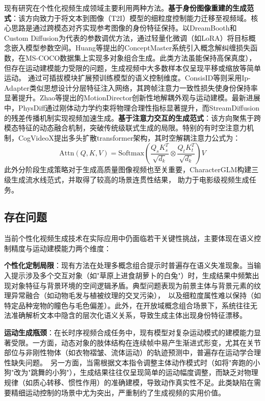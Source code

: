 现有研究在个性化视频生成领域主要利用两种方法。\textbf{基于身份图像重建的生成范式}：该方向致力于将文本到图像（T2I）模型的细粒度控制能力迁移至视频域。核心思路是通过跨模态对齐实现参考图像的身份特征保持。以DreamBooth\cite{ruiz2023dreambooth}和Custom Diffusion\cite{kumari2023multi}为代表的参数调优方法，通过轻量化微调（如LoRA）将目标概念嵌入模型参数空间。Huang等\cite{huang2025conceptmaster}提出的ConceptMaster系统引入概念解纠缠损失函数，在MS-COCO数据集上实现多对象组合生成。此类方法虽能保持高保真度），但存在运动建模能力受限的问题，生成视频中大多数样本仅呈现平移或缩放等简单运动。
通过可插拔模块扩展预训练模型的语义控制维度。ConsisID\cite{huang2024consistentid}等则采用Ip-Adapter类似思想设计分层特征注入网络，其跨帧注意力一致性损失使身份保持率显著提升。Zhao等\cite{zhao2024motiondirector}提出的MotionDirector创新性地解耦外观与运动建模。最新进展中，PhysDiff\cite{yuan2023physdiff}通过刚体动力学约束将物理合理性指标显著提升，而StreamDiffusion\cite{kodaira2023streamdiffusion}的残差传播机制实现视频加速生成。\textbf{基于注意力交互的生成范式}：该方向聚焦于跨模态特征的动态融合机制，突破传统级联式生成的局限。特别的有时空注意力机制，CogVideoX\cite{yang2024cogvideox}提出多头扩散transformer架构，其时空解耦注意力公式为：
\begin{equation}
\text{Attn}(Q,K,V) = \text{Softmax}(\frac{Q_sK_s^T}{\sqrt{d_k}} \otimes \frac{Q_tK_t^T}{\sqrt{d_k}})V
\end{equation}此外分阶段生成策略对于生成高质量图像视频也至关重要，CharacterGLM\cite{zhou2023characterglm}构建三级生成流水线范式，并取得了较高的场景连贯性结果， 助力于电影级视频生成任务。
\subsection{存在问题}
当前个性化视频生成技术在实际应用中仍面临若干关键性挑战，主要体现在语义控制精度与运动建模能力两个维度：

\textbf{个性化定制局限}：现有方法在处理多概念组合提示时普遍存在语义失准现象。当输入提示涉及多个交互对象（如"草原上进食胡萝卜的白兔"）时，生成结果中频繁出现对象特征与背景环境的空间逻辑矛盾。典型问题表现为前景主体与背景元素的纹理异常融合（如动物毛发与植被纹理的交叉污染），\
以及细粒度属性难以保持（如特定品种宠物的瞳色与毛色偏差）。此外，在开放域概念组合场景下，系统往往无法准确解析文本中隐含的层次化语义关系，导致生成主体出现身份特征漂移。

\textbf{运动生成瓶颈}：在长时序视频合成任务中，现有模型对复杂运动模式的建模能力显著受限。一方面，动态对象的肢体结构在连续帧中易产生渐进式形变，尤其在关节部位与非刚性物体（如衣物褶皱、流体运动）的轨迹预测中，普遍存在运动学合理性缺失问题。\
另一方面，当需根据文本指令调整主体动作模式时（如将"奔跑的小狗"改为"跳舞的小狗"），生成结果往往仅呈现简单的运动幅度调整，而缺乏对物理规律（如质心转移、惯性作用）的准确建模，导致动作真实性不足。此类缺陷在需要精细运动控制的场景中尤为突出，严重制约了生成视频的实用价值。

